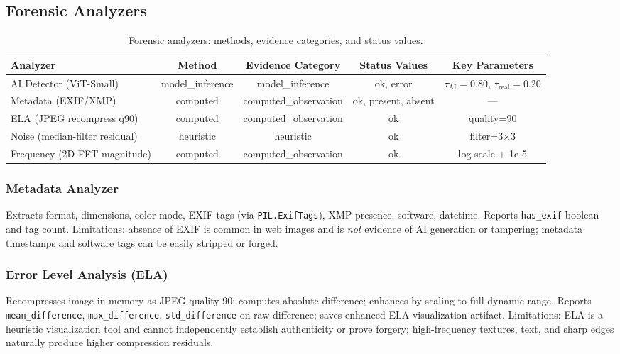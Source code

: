 \documentclass[10pt,conference,compsoc]{IEEEtran}
\begin{document}
\subsection{Forensic Analyzers}
\label{sec:analyzers}

\begin{table}[t]
\caption{Forensic analyzers: methods, evidence categories, and status values.}
\label{tab:analyzers}
\centering
\begin{tabular}{lcccc}
\toprule
Analyzer & Method & Evidence Category & Status Values & Key Parameters \\
\midrule
AI Detector (ViT-Small) & model\_inference & model\_inference & ok, error & $\tau_{\mathrm{AI}}=0.80$, $\tau_{\mathrm{real}}=0.20$ \\
Metadata (EXIF/XMP) & computed & computed\_observation & ok, present, absent & — \\
ELA (JPEG recompress q90) & computed & computed\_observation & ok & quality=90 \\
Noise (median-filter residual) & heuristic & heuristic & ok & filter=3$\times$3 \\
Frequency (2D FFT magnitude) & computed & computed\_observation & ok & log-scale + 1e-5 \\
\bottomrule
\end{tabular}
\end{table}

\subsubsection{Metadata Analyzer}
Extracts format, dimensions, color mode, EXIF tags (via \texttt{PIL.ExifTags}), XMP presence, software, datetime.
Reports \texttt{has\_exif} boolean and tag count.
Limitations: absence of EXIF is common in web images and is \emph{not} evidence of AI generation or tampering; metadata timestamps and software tags can be easily stripped or forged.

\subsubsection{Error Level Analysis (ELA)}
Recompresses image in-memory as JPEG quality 90; computes absolute difference; enhances by scaling to full dynamic range.
Reports \texttt{mean\_difference}, \texttt{max\_difference}, \texttt{std\_difference} on raw difference; saves enhanced ELA visualization artifact.
Limitations: ELA is a heuristic visualization tool and cannot independently establish authenticity or prove forgery; high-frequency textures, text, and sharp edges naturally produce higher compression residuals.
\end{document}
